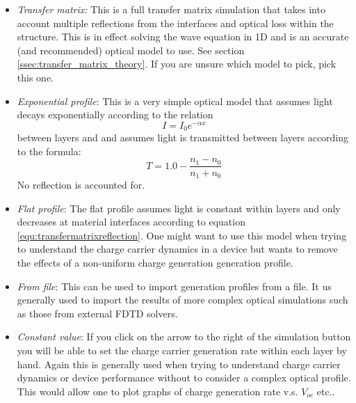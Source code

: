 \begin{itemize}
  \item \emph{Transfer matrix:} This is a full transfer matrix simulation that takes into account multiple reflections from the interfaces and optical loss within the structure. This is in effect solving the wave equation in 1D and is an accurate (and recommended) optical model to use. See section \ref{ssec:transfer_matrix_theory}. If you are unsure which model to pick, pick this one.

  \item \emph{Exponential profile}: This is a very simple optical model that assumes light decays exponentially according to the relation
\begin{equation}
I=I_{0}e^{-\alpha x}
\label{efield2}
\end{equation}
between layers and and assumes light is transmitted between layers according to the formula:
\begin{equation}
T=1.0-\frac{n_1-n_0}{n_1+n_0}
\label{equ:transfermatrixreflection}
\end{equation}
No reflection is accounted for.
  \item \emph{Flat profile}: The flat profile assumes light is constant within layers and only decreases at material interfaces according to equation \ref{equ:transfermatrixreflection}. One might want to use this model when trying to understand the charge carrier dynamics in a device but wants to remove the effects of a non-uniform charge generation generation profile.

  \item \emph{From file}: This can be used to import generation profiles from a file. It us generally used to import the results of more complex optical simulations such as those from external FDTD solvers.
  \item \emph{Constant value}: If you click on the arrow to the right of the simulation button you will be able to set the charge carrier generation rate within each layer by hand. Again this is generally used when trying to understand charge carrier dynamics or device performance without to consider a complex optical profile. This would allow one to plot graphs of charge generation rate v.s. $V_{oc}$ etc..
\end{itemize}

